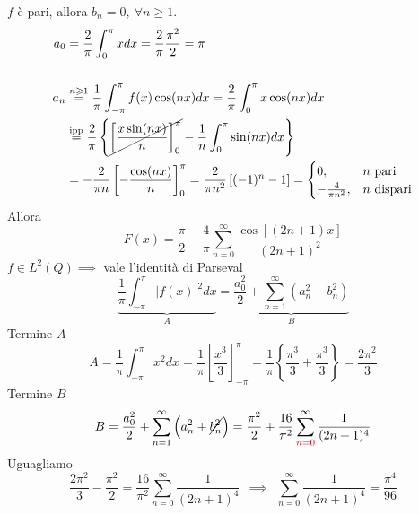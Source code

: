 $f$ è pari, allora $b_{n} = 0,\ \forall n\geqslant 1$.
\begin{align*}
a_{0} & = \frac{2}{\pi }\int ^{\pi }_{0} xdx = \frac{2}{\pi }\frac{\pi ^{2}}{2} = \pi \\
 & \\
a_{n} & \overset{n\geqslant 1}{ = }\frac{1}{\pi }\int ^{\pi }_{ - \pi } f(x)\cos(nx) dx = \frac{2}{\pi }\int ^{\pi }_{0} x\cos(nx) dx\\
 & \overset{\text{ipp}}{ = }\frac{2}{\pi }\left\{\cancel{\left[\frac{x\sin(nx)}{n}\right]^{\pi }_{0}} - \frac{1}{n}\int ^{\pi }_{0}\sin(nx) dx\right\}\\
 & = - \frac{2}{\pi n}\left[ - \frac{\cos(nx)}{n}\right]^{\pi }_{0} = \frac{2}{\pi n^{2}}\left[(- 1)^{n} - 1\right] = \begin{cases}
0, & n\ \text{pari}\\
- \frac{4}{\pi n^{2}} , & n\ \text{dispari}
\end{cases}
\end{align*}
Allora
\begin{equation*}
F(x) = \frac{\pi }{2} - \frac{4}{\pi }\sum\limits ^{\infty }_{n = 0}\frac{\cos[(2n + 1) x]}{(2n + 1)^{2}}
\end{equation*}
$f\in L^{2}(Q) \implies $ vale l'identità di Parseval
\begin{equation*}
\underbrace{\frac{1}{\pi }\int ^{\pi }_{ - \pi }| f(x)| ^{2} dx}_{A} = \underbrace{\frac{a^{2}_{0}}{2} + \sum\limits ^{\infty }_{n = 1}\left(a^{2}_{n} + b^{2}_{n}\right)}_{B}
\end{equation*}
Termine $A$
\begin{equation*}
A = \frac{1}{\pi }\int ^{\pi }_{ - \pi } x^{2} dx = \frac{1}{\pi }\left[\frac{x^{3}}{3}\right]^{\pi }_{ - \pi } = \frac{1}{\pi }\left\{\frac{\pi ^{3}}{3} + \frac{\pi ^{3}}{3}\right\} = \frac{2\pi ^{2}}{3}
\end{equation*}
Termine $B$
\begin{equation*}
B = \frac{a^{2}_{0}}{2} + \sum\limits ^{\infty }_{n = 1}\left(a^{2}_{n} + \cancel{b^{2}_{n}}\right) = \frac{\pi ^{2}}{2} + \frac{16}{\pi ^{2}}\sum\limits ^{\infty }_{\textcolor[rgb]{0.82,0.01,0.11}{n = 0}}\frac{1}{(2n + 1)^{4}}
\end{equation*}
Uguagliamo
\begin{equation*}
\frac{2\pi ^{2}}{3} - \frac{\pi ^{2}}{2} = \frac{16}{\pi ^{2}}\sum\limits ^{\infty }_{n = 0}\frac{1}{(2n + 1)^{4}} \ \ \implies \ \ \sum\limits ^{\infty }_{n = 0}\frac{1}{(2n + 1)^{4}} = \frac{\pi ^{4}}{96}
\end{equation*}
